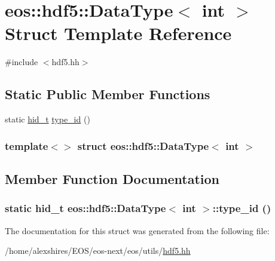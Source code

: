 \hypertarget{structeos_1_1hdf5_1_1DataType_3_01int_01_4}{
\section{eos::hdf5::DataType$<$ int $>$ Struct Template Reference}
\label{structeos_1_1hdf5_1_1DataType_3_01int_01_4}
}


{\ttfamily \#include $<$hdf5.hh$>$}\subsection*{Static Public Member Functions}
\begin{DoxyCompactItemize}
\item 
static \hyperlink{namespaceeos_1_1hdf5_a5bd5e209f1bf36cdc5551465dacf2e74}{hid\_\-t} \hyperlink{structeos_1_1hdf5_1_1DataType_3_01int_01_4_ad6b7bc5e9e4745f8a02fa6ceeaa110ba}{type\_\-id} ()
\end{DoxyCompactItemize}
\subsubsection*{template$<$$>$ struct eos::hdf5::DataType$<$ int $>$}



\subsection{Member Function Documentation}
\hypertarget{structeos_1_1hdf5_1_1DataType_3_01int_01_4_ad6b7bc5e9e4745f8a02fa6ceeaa110ba}{
\subsubsection[{type\_\-id}]{\setlength{\rightskip}{0pt plus 5cm}static {\bf hid\_\-t} {\bf eos::hdf5::DataType}$<$ int $>$::type\_\-id ()}}
\label{structeos_1_1hdf5_1_1DataType_3_01int_01_4_ad6b7bc5e9e4745f8a02fa6ceeaa110ba}


The documentation for this struct was generated from the following file:\begin{DoxyCompactItemize}
\item 
/home/alexshires/EOS/eos-\/next/eos/utils/\hyperlink{hdf5_8hh}{hdf5.hh}\end{DoxyCompactItemize}
